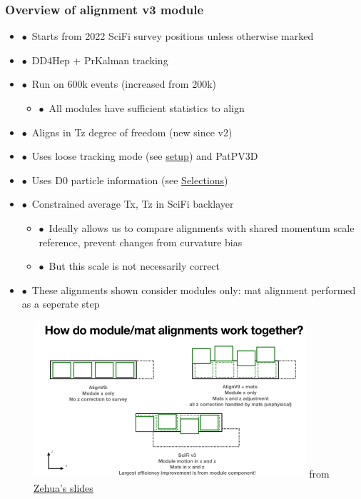 \documentclass[aspectratio=1610, 12pt, xcolor=dvipsnames]{beamer}
\begin{document}
\begin{frame}\frametitle{Overview of alignment v3 module}
 \begin{itemize}
	  \item $\bullet$\, Starts from 2022 SciFi survey positions unless otherwise marked
	  \item $\bullet$\, DD4Hep + PrKalman tracking
	  \item $\bullet$\, Run on 600k events (increased from 200k)
    \begin{itemize}
      \item $\bullet$\, All modules have sufficient statistics to align
    \end{itemize}
    \item $\bullet$\, Aligns in Tz degree of freedom (new since v2)
    \item $\bullet$\, Uses loose tracking mode (see \href{https://gitlab.cern.ch/lhcb/Moore/-/blob/master/Hlt/RecoConf/options/hlt2_loose_tracking_config.py}{setup}) and PatPV3D
    \item $\bullet$\, Uses D0 particle information (see \href{https://gitlab.cern.ch/lhcb/Alignment/-/blob/master/Alignment/Humboldt/python/Humboldt/ParticleSelections.py}{Selections})
    \item $\bullet$\, Constrained average Tx, Tz in SciFi backlayer
    \begin{itemize}
      \item $\bullet$\, Ideally allows us to compare alignments with shared momentum scale reference, prevent changes from curvature bias
      \item $\bullet$\, But this scale is not necessarily correct
    \end{itemize}
    \item $\bullet$\, These alignments shown consider modules only: mat alignment performed as a seperate step
  \end{itemize}
\end{frame}

\begin{frame}
  \begin{figure}
    \includegraphics[width=0.9\textwidth]{plots/modules_and_mats.png}
    from \href{https://indico.cern.ch/event/1275394/contributions/5359493/attachments/2628409/4549668/SciFi_mat_alignment.pdf}{Zehua's slides}
  \end{figure}
\end{frame}
\end{document}
